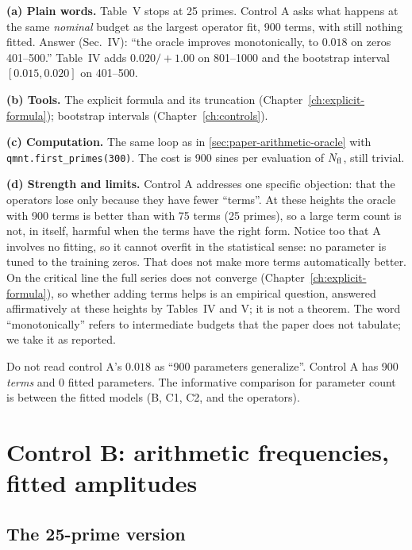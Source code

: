 \textbf{(a) Plain words.} Table~V stops at 25 primes. Control A asks what happens at the same \emph{nominal} budget as the largest operator fit, 900 terms, with still nothing fitted. Answer (Sec.~IV): ``the oracle improves monotonically, to $0.018$ on zeros 401--500.'' Table~IV adds $0.020/+1.00$ on 801--1000 and the bootstrap interval $[0.015, 0.020]$ on 401--500.

\textbf{(b) Tools.} The explicit formula and its truncation (Chapter~\ref{ch:explicit-formula}); bootstrap intervals (Chapter~\ref{ch:controls}).

\textbf{(c) Computation.} The same loop as in \cref{sec:paper-arithmetic-oracle} with \texttt{qmnt.first\_primes(300)}. The cost is 900 sines per evaluation of $N_{\mathrm{fl}}$, still trivial.

\textbf{(d) Strength and limits.} Control A addresses one specific objection: that the operators lose only because they have fewer ``terms''. At these heights the oracle with 900 terms is better than with 75 terms (25 primes), so a large term count is not, in itself, harmful when the terms have the right form. Notice too that A involves no fitting, so it cannot overfit in the statistical sense: no parameter is tuned to the training zeros. That does not make more terms automatically better. On the critical line the full series does not converge (Chapter~\ref{ch:explicit-formula}), so whether adding terms helps is an empirical question, answered affirmatively at these heights by Tables~IV and V; it is not a theorem. The word ``monotonically'' refers to intermediate budgets that the paper does not tabulate; we take it as reported.

\begin{pitfall}
Do not read control A's $0.018$ as ``900 parameters generalize''. Control A has 900 \emph{terms} and $0$ fitted parameters. The informative comparison for parameter count is between the fitted models (B, C1, C2, and the operators).
\end{pitfall}

\section{Control B: arithmetic frequencies, fitted amplitudes}\label{sec:paper-arithmetic-B}

\subsection{The 25-prime version}

